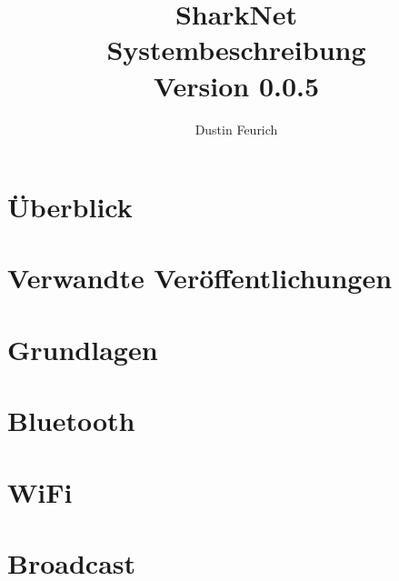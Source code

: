 \documentclass[german, 12pt]{book}
\begin{document}
	
\onehalfspacing

\title{SharkNet\\
Systembeschreibung \\
Version 0.0.5
}

\author{
Dustin Feurich
}

\maketitle

\tableofcontents

\chapter{Überblick}


\chapter{Verwandte Veröffentlichungen}


\chapter{Grundlagen}


\chapter{Bluetooth}


\chapter{WiFi}


\chapter{Broadcast}

\end{document}
